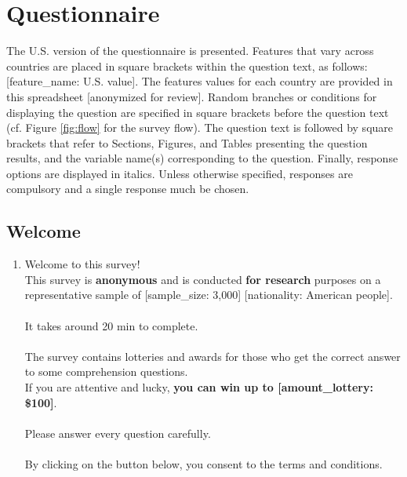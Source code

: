 \section*{Questionnaire}\label{app:questionnaire}
The U.S. version of the questionnaire is presented. Features that vary across countries are placed in square brackets within the question text, as follows: [feature\_name: U.S. value]. The features values for each country are provided in this spreadsheet [anonymized for review]. %
Random branches or conditions for displaying the question are specified in square brackets before the question text (cf. Figure \ref{fig:flow} for the survey flow). The question text is followed by square brackets that refer to Sections, Figures, and Tables presenting the question results, and the variable name(s) corresponding to the question. Finally, response options are displayed in italics. 
Unless otherwise specified, responses are compulsory and a single response much be chosen. %

\subsection*{Welcome} 
 \begin{enumerate} 
\item  \label{q:consent} Welcome to this survey!\\
This survey is \textbf{anonymous }and is conducted \textbf{for research} purposes on a representative sample of [sample\_size: 3,000] [nationality: American people].\\
~\\
It takes around 20 min to complete.\\
~\\
The survey contains lotteries and awards for those who get the correct answer to some comprehension questions.\\
If you are attentive and lucky, \textbf{you can win up to [amount\_lottery: \$100]}.\\
~\\
Please answer every question carefully.\\
~\\
By clicking on the button below, you consent to the terms and conditions.

\end{enumerate} 

